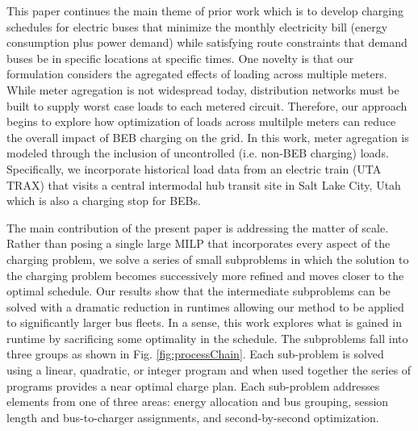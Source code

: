 \par This paper continues the main theme of prior work which is to develop charging schedules for electric buses that minimize the monthly electricity bill (energy consumption plus power demand) while satisfying route constraints that demand buses be in specific locations at specific times.  One novelty is that our formulation considers the agregated effects of loading across multiple meters.  While meter agregation is not widespread today, distribution networks must be built to supply worst case loads to each metered circuit.  Therefore, our approach begins to explore how optimization of loads across multilple meters can reduce the overall impact of BEB charging on the grid.  In this work, meter agregation is modeled through the inclusion of uncontrolled (i.e. non-BEB charging) loads.  Specifically, we incorporate historical load data from an electric train (UTA TRAX) that visits a central intermodal hub transit site in Salt Lake City, Utah which is also a charging stop for BEBs.  
\par The main contribution of the present paper is addressing the matter of scale.  Rather than posing a single large MILP that incorporates every aspect of the charging problem, we solve a series of small subproblems in which the solution to the charging problem becomes successively more refined and moves closer to the optimal schedule.  Our results show that the intermediate subproblems can be solved with a dramatic reduction in runtimes allowing our method to be applied to significantly larger bus fleets.  In a sense, this work explores what is gained in runtime by sacrificing some optimality in the schedule.  The subproblems fall into three groups as shown in Fig. \ref{fig:processChain}.  Each sub-problem is solved using a linear, quadratic, or integer program and when used together the series of programs provides a near optimal charge plan. Each sub-problem addresses elements from one of three areas: energy allocation and bus grouping, session length and bus-to-charger assignments, and second-by-second optimization.  

